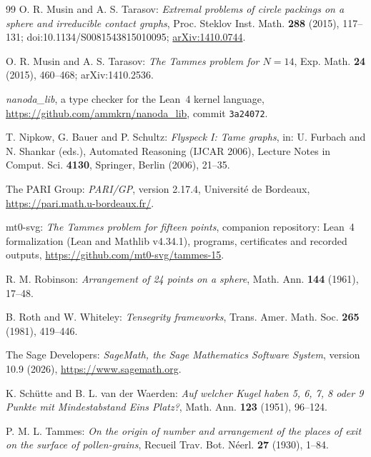 \documentclass[12pt]{amsart}
\theoremstyle{definition}
\theoremstyle{plain}
\theoremstyle{definition}
\begin{document}
\begin{thebibliography}{99}
 O. R. Musin and A. S. Tarasov: \emph{Extremal problems of circle packings on a sphere and irreducible contact graphs}, Proc. Steklov Inst. Math. \textbf{288} (2015), 117--131; doi:10.1134/S0081543815010095; \href{https://arxiv.org/abs/1410.0744}{arXiv:1410.0744}.

 O. R. Musin and A. S. Tarasov: \emph{The Tammes problem for $N=14$}, Exp. Math. \textbf{24} (2015), 460--468; arXiv:1410.2536.

 \emph{nanoda\_lib}, a type checker for the Lean~4 kernel language, \url{https://github.com/ammkrn/nanoda_lib}, commit \texttt{3a24072}.

 T. Nipkow, G. Bauer and P. Schultz: \emph{Flyspeck I: Tame graphs}, in: U. Furbach and N. Shankar (eds.), Automated Reasoning (IJCAR 2006), Lecture Notes in Comput. Sci. \textbf{4130}, Springer, Berlin (2006), 21--35.

 The PARI Group: \emph{PARI/GP}, version 2.17.4, Universit\'e de Bordeaux, \url{https://pari.math.u-bordeaux.fr/}.

 mt0-svg: \emph{The Tammes problem for fifteen points}, companion repository: Lean~4 formalization (Lean and Mathlib v4.34.1), programs, certificates and recorded outputs, \url{https://github.com/mt0-svg/tammes-15}.

 R. M. Robinson: \emph{Arrangement of 24 points on a sphere}, Math. Ann. \textbf{144} (1961), 17--48.

 B. Roth and W. Whiteley: \emph{Tensegrity frameworks}, Trans. Amer. Math. Soc. \textbf{265} (1981), 419--446.

 The Sage Developers: \emph{SageMath, the Sage Mathematics Software System}, version 10.9 (2026), \url{https://www.sagemath.org}.

 K. Sch\"utte and B. L. van der Waerden: \emph{Auf welcher Kugel haben 5, 6, 7, 8 oder 9 Punkte mit Mindestabstand Eins Platz?}, Math. Ann. \textbf{123} (1951), 96--124. %

 P. M. L. Tammes: \emph{On the origin of number and arrangement of the places of exit on the surface of pollen-grains}, Recueil Trav. Bot. N\'eerl. \textbf{27} (1930), 1--84.

\end{thebibliography}
\end{document}
